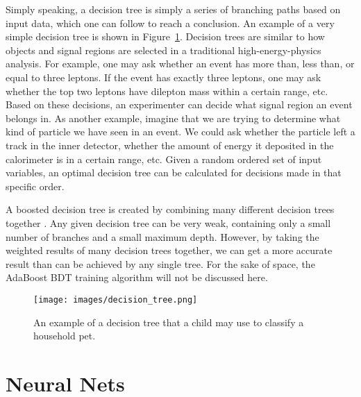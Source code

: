Simply speaking, a decision tree is simply a series of branching paths based on input data, which one can follow to reach a conclusion. An example of a very simple decision tree is shown in Figure~\ref{decision_tree}. Decision trees are similar to how objects and signal regions are selected in a traditional high-energy-physics analysis. For example, one may ask whether an event has more than, less than, or equal to three leptons. If the event has exactly three leptons, one may ask whether the top two leptons have dilepton mass within a certain range, etc. Based on these decisions, an experimenter can decide what signal region an event belongs in. As another example, imagine that we are trying to determine what kind of particle we have seen in an event. We could ask whether the particle left a track in the inner detector, whether the amount of energy it deposited in the calorimeter is in a certain range, etc. Given a random ordered set of input variables, an optimal decision tree can be calculated for decisions made in that specific order.

A boosted decision tree is created by combining many different decision trees together \cite{BDT}. Any given decision tree can be very weak, containing only a small number of branches and a small maximum depth. However, by taking the weighted results of many decision trees together, we can get a more accurate result than can be achieved by any single tree. For the sake of space, the AdaBoost BDT training algorithm will not be discussed here.

\begin{figure}[t]
    \centering
    \texttt{[image: images/decision\_tree.png]}
    \caption{An example of a decision tree that a child may use to classify a household pet.}
    \label{decision_tree}
\end{figure}

\section{Neural Nets}

